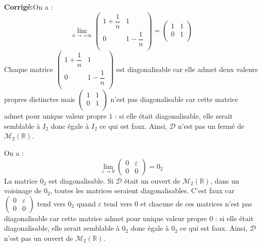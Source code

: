 \documentclass[a4paper,twoside,french,11pt]{VcCours}
\newcommand{\corr}{\textbf{Corrigé:}}
\begin{document}
\corr On a :
$$ \lim_{n \rightarrow + \infty} \begin{pmatrix}
1+ \dfrac{1}{n} & 1 \\
0 & 1- \dfrac{1}{n} \\
\end{pmatrix} = \begin{pmatrix}
1 & 1 \\
0 & 1 \\
\end{pmatrix}$$
Chaque matrice $\begin{pmatrix}
1+ \dfrac{1}{n} & 1 \\
0 & 1- \dfrac{1}{n} \\
\end{pmatrix}$ est diagonalisable car elle admet deux valeurs propres distinctes mais $\begin{pmatrix}
1 & 1 \\
0 & 1 \\
\end{pmatrix}$ n'est pas diagonalisable car cette matrice admet pour unique valeur propre $1$ : si elle était diagonalisable, elle serait semblable à $I_2$ donc égale à $I_2$ ce qui est faux. Ainsi, $\mathcal{D}$ n'est pas un fermé de $\mathcal{M}_2(\mathbb{R})$.


On a : 
$$ \lim_{\varepsilon \rightarrow 0} \begin{pmatrix}
0 & \varepsilon \\
0 & 0 
\end{pmatrix} = 0_2$$
La matrice $0_2$ est diagonalisable. Si $\mathcal{D}$ était un ouvert de $\mathcal{M}_2(\mathbb{R})$, dans un voisinage de $0_2$, toutes les matrices seraient diagonalisables. C'est faux car $\begin{pmatrix}
0 & \varepsilon \\
0 & 0 
\end{pmatrix}$ tend vers $0_2$ quand $\varepsilon$ tend vers $0$ et chacune de ces matrices n'est pas diagonalisable car cette matrice admet pour unique valeur propre $0$ : si elle était diagonalisable, elle serait semblable à $0_2$ donc égale à $0_2$ ce qui est faux. Ainsi, $\mathcal{D}$ n'est pas un ouvert de $\mathcal{M}_2(\mathbb{R})$.
\end{document}

